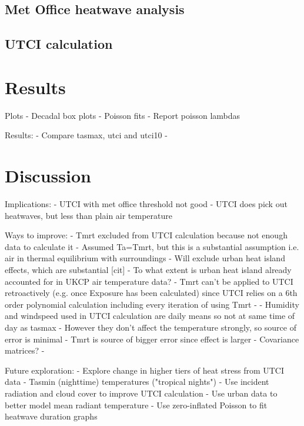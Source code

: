 \documentclass[10pt,letterpaper]{article}
\begin{document}
\subsection*{Met Office heatwave analysis}


\subsection*{UTCI calculation}










\section*{Results}



Plots
- Decadal box plots
- Poisson fits
- Report poisson lambdas

Results:
- Compare tasmax, utci and utci10
- 

\section*{Discussion}

Implications:
- UTCI with met office threshold not good
- UTCI does pick out heatwaves, but less than plain air temperature

Ways to improve:
- Tmrt excluded from UTCI calculation because not enough data to calculate it
    - Assumed Ta=Tmrt, but this is a substantial assumption i.e. air in thermal equilibrium with surroundings
    - Will exclude urban heat island effects, which are substantial [cit]
    - To what extent is urban heat island already accounted for in UKCP air temperature data?
    - Tmrt can't be applied to UTCI retroactively (e.g. once Exposure has been calculated) since UTCI relies on a 6th order polynomial calculation including every iteration of using Tmrt
    - \cite{Weihs2018}
- Humidity and windspeed used in UTCI calculation are daily means so not at same time of day as tasmax
    - However they don't affect the temperature strongly, so source of error is minimal
    - Tmrt is source of bigger error since effect is larger
    - Covariance matrices?
- 

Future exploration:
- Explore change in higher tiers of heat stress from UTCI data
- Tasmin (nighttime) temperatures ("tropical nights")
- Use incident radiation and cloud cover to improve UTCI calculation
- Use urban data to better model mean radiant temperature
- Use zero-inflated Poisson to fit heatwave duration graphs
\end{document}
